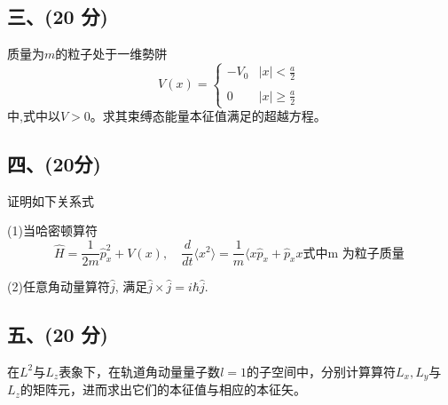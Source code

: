 \subsection{三、(20 分) }
质量为$m$的粒子处于一维勢阱
$$V(x) = 
\begin{cases} 
-V_0 & |x| < \frac{a}{2} \\\\
0 &  |x| \geq \frac{a}{2} 
\end{cases}~
$$
中,式中以$V>0$。求其束缚态能量本征值满足的超越方程。
\subsection{四、(20分) }
证明如下关系式

(1)当哈密顿算符$$\hat{H} = \frac{1}{2m}\hat{p}_x^2 + V(x), \quad \frac{d}{dt} \langle x^2 \rangle = \frac{1}{m} \langle x \hat{p}_x + \hat{p}_x x \text{式中m 为粒子质量}~$$ 

(2)任意角动量算符$\hat{j}$, 满足$\hat{j} \times \hat{j} = i\hbar \hat{j}$.
\subsection{五、(20 分)}
在$L^2$与$L_z$表象下，在轨道角动量量子数$l=1$的子空间中，分别计算算符$L_x,L_y$与$L_z$的矩阵元，进而求出它们的本征值与相应的本征矢。
